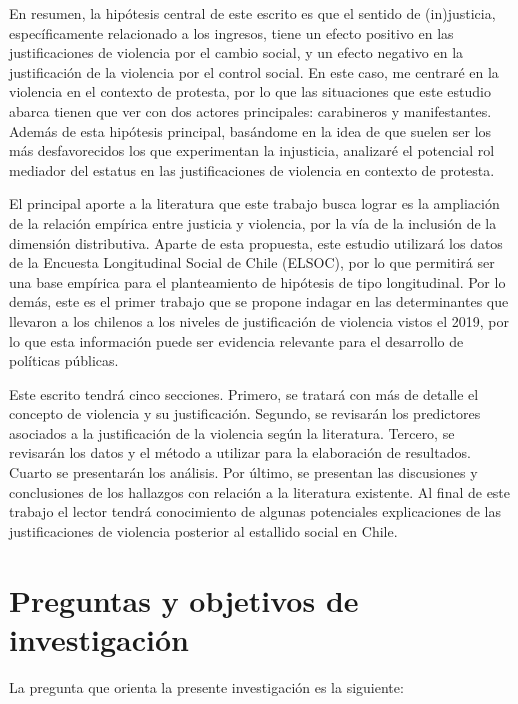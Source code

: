 \documentclass[12pt,twoside]{templates/facsothesis}
\begin{document}
En resumen, la hipótesis central de este escrito es que el sentido de (in)justicia, específicamente relacionado a los ingresos, tiene un efecto positivo en las justificaciones de violencia por el cambio social, y un efecto negativo en la justificación de la violencia por el control social. En este caso, me centraré en la violencia en el contexto de protesta, por lo que las situaciones que este estudio abarca tienen que ver con dos actores principales: carabineros y manifestantes. Además de esta hipótesis principal, basándome en la idea de que suelen ser los más desfavorecidos los que experimentan la injusticia, analizaré el potencial rol mediador del estatus en las justificaciones de violencia en contexto de protesta.

El principal aporte a la literatura que este trabajo busca lograr es la ampliación de la relación empírica entre justicia y violencia, por la vía de la inclusión de la dimensión distributiva. Aparte de esta propuesta, este estudio utilizará los datos de la Encuesta Longitudinal Social de Chile (ELSOC), por lo que permitirá ser una base empírica para el planteamiento de hipótesis de tipo longitudinal. Por lo demás, este es el primer trabajo que se propone indagar en las determinantes que llevaron a los chilenos a los niveles de justificación de violencia vistos el 2019, por lo que esta información puede ser evidencia relevante para el desarrollo de políticas públicas.

Este escrito tendrá cinco secciones. Primero, se tratará con más de detalle el concepto de violencia y su justificación. Segundo, se revisarán los predictores asociados a la justificación de la violencia según la literatura. Tercero, se revisarán los datos y el método a utilizar para la elaboración de resultados. Cuarto se presentarán los análisis. Por último, se presentan las discusiones y conclusiones de los hallazgos con relación a la literatura existente. Al final de este trabajo el lector tendrá conocimiento de algunas potenciales explicaciones de las justificaciones de violencia posterior al estallido social en Chile.

\hypertarget{preguntas-y-objetivos-de-investigaciuxf3n}{%
\chapter{Preguntas y objetivos de investigación}\label{preguntas-y-objetivos-de-investigaciuxf3n}}

La pregunta que orienta la presente investigación es la siguiente:
\end{document}
